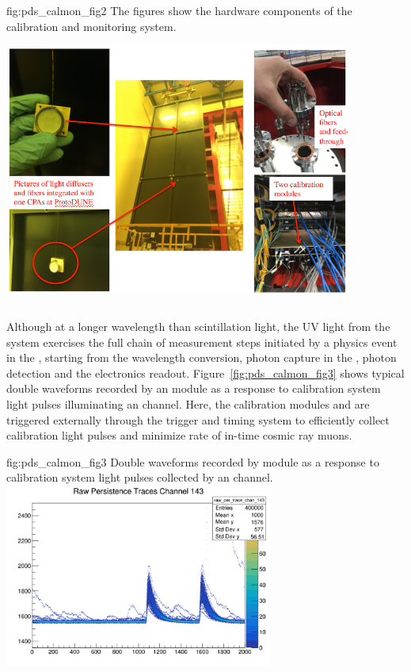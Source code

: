  \begin{dunefigure}
 {fig:pds_calmon_fig2}
 {The figures show the hardware components of the  calibration and monitoring system.}
 \includegraphics[angle=0,width=11.4cm,height=9cm]{graphics/pds-calmon-fig2.png}
\end{dunefigure}

Although at a longer wavelength than \lar scintillation light, the UV light from the system exercises the full chain of measurement steps initiated by a physics event in the , starting from the wavelength conversion, photon capture in the , photon detection and the  electronics readout.
Figure~\ref{fig:pds_calmon_fig3} shows typical double waveforms recorded by an   module as a response to calibration system
light pulses illuminating 
an  channel. Here, the calibration modules and  are triggered externally through the trigger and timing system to efficiently collect calibration light pulses  and minimize rate of in-time cosmic ray muons.

 \begin{dunefigure}
 {fig:pds_calmon_fig3}
 {Double waveforms recorded by   module as a response to calibration system light pulses collected by an  channel.}
\includegraphics[height=6cm]{graphics/pds-calmon-example.png}
\end{dunefigure}

